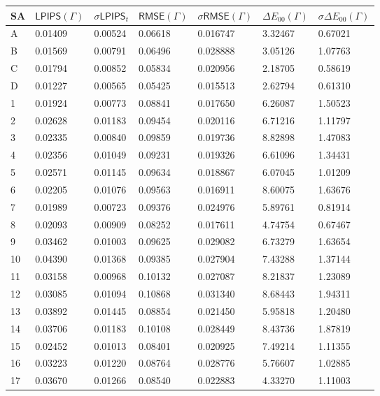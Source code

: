 \begin{table}[H]
	\centering
	\begin{tabular}{|l|l|l|l|l|l|l|}
	\hline
	\textbf{SA}      &  $\mathsf{LPIPS}(\varGamma)$       & $\sigma \mathsf{LPIPS}_t$ & $\mathsf{RMSE}(\varGamma)$ & $\sigma \mathsf{RMSE}(\varGamma)$ & $\Delta E_{00}(\varGamma)$ & $ \sigma \Delta E_{00}(\varGamma)$\\
	\hline
	A  & 0.01409& 0.00524 & 0.06618& 0.016747 & 3.32467 & 0.67021\\
	B  & 0.01569& 0.00791 & 0.06496& 0.028888 & 3.05126 & 1.07763\\
	C  & 0.01794& 0.00852 & 0.05834& 0.020956 & 2.18705 & 0.58619\\
	D  & 0.01227& 0.00565 & 0.05425& 0.015513 & 2.62794 & 0.61310\\
	1  & 0.01924& 0.00773 & 0.08841& 0.017650 & 6.26087 & 1.50523\\
	2  & 0.02628& 0.01183 & 0.09454& 0.020116 & 6.71216 & 1.11797\\
	3  & 0.02335& 0.00840 & 0.09859& 0.019736 & 8.82898 & 1.47083\\
	4  & 0.02356& 0.01049 & 0.09231& 0.019326 & 6.61096 & 1.34431\\
	5  & 0.02571& 0.01145 & 0.09634& 0.018867 & 6.07045 & 1.01209\\
	6  & 0.02205& 0.01076 & 0.09563& 0.016911 & 8.60075 & 1.63676\\
	7  & 0.01989& 0.00723 & 0.09376& 0.024976 & 5.89761 & 0.81914\\
	8  & 0.02093& 0.00909 & 0.08252& 0.017611 & 4.74754 & 0.67467\\
	9  & 0.03462& 0.01003 & 0.09625& 0.029082 & 6.73279 & 1.63654\\
	10 & 0.04390& 0.01368 & 0.09385& 0.027904 & 7.43288 & 1.37144\\
	11 & 0.03158& 0.00968 & 0.10132& 0.027087 & 8.21837 & 1.23089\\
	12 & 0.03085& 0.01094 & 0.10868& 0.031340 & 8.68443 & 1.94311\\
	13 & 0.03892& 0.01445 & 0.08854& 0.021450 & 5.95818 & 1.20480\\
	14 & 0.03706& 0.01183 & 0.10108& 0.028449 & 8.43736 & 1.87819\\
	15 & 0.02452& 0.01013 & 0.08401& 0.020925 & 7.49214 & 1.11355\\
	16 & 0.03223& 0.01220 & 0.08764& 0.028776 & 5.76607 & 1.02885\\
	17 & 0.03670& 0.01266 & 0.08540& 0.022883 & 4.33270 & 1.11003\\

\end{tabular}
\end{table}
